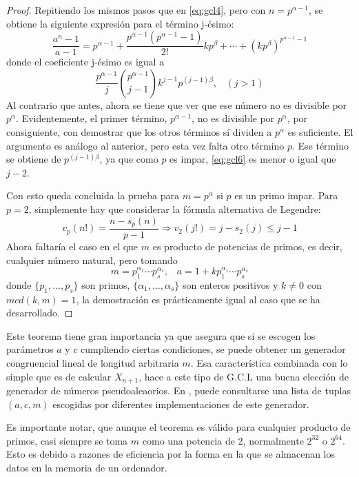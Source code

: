 \begin{proof}
Repitiendo los mismos pasos que en \eqref{eq:gcl4}, pero con $n=p^{\alpha-1}$, se obtiene la siguiente expresión para el término j-ésimo:
\begin{equation}\label{eq:gcl5}
\frac{a^n-1}{a-1}=p^{\alpha-1}+\frac{p^{\alpha-1}(p^{\alpha-1}-1)}{2!}kp^\beta+\cdots+(kp^\beta)^{p^{\alpha-1}-1}
\end{equation}
donde el coeficiente j-ésimo es igual a
\[
\frac{p^{\alpha-1}}{j} \binom{p^{\alpha-1}}{j-1} k^{j-1}p^{(j-1)\beta}, \;\;\; (j>1)
\]
Al contrario que antes, ahora se tiene que ver que ese número no es divisible por $p^\alpha$. Evidentemente, el primer término, $p^{\alpha-1}$, no es divisible por $p^\alpha$, por consiguiente, con demostrar que los otros términos sí dividen a $p^\alpha$ es suficiente. El argumento es análogo al anterior, pero esta vez falta otro término $p$. Ese término se obtiene de $p^{(j-1)\beta}$, ya que como $p$ es impar, \eqref{eq:gcl6} es menor o igual que $j-2$.

Con esto queda concluida la prueba para $m=p^\alpha$ si $p$ es un primo impar. Para $p=2$, simplemente hay que considerar la fórmula alternativa de Legendre:
\[
v_p(n!)=\frac{n-s_p(n)}{p-1} \Rightarrow v_2(j!)=j-s_2(j)\leq j-1
\]
Ahora faltaría el caso en el que $m$ es producto de potencias de primos, es decir, cualquier número natural, pero tomando 
\[
m=p_1^{\alpha_1}\cdots p_s^{\alpha_s}, \;\;\; a=1+kp_1^{\alpha_1}\cdots p_s^{\alpha_s}
\]
donde $\{p_1,\ldots, p_s\}$ son primos, $\{\alpha_1,\ldots,\alpha_s\}$ son enteros positivos y $k\neq 0$ con $mcd(k,m)=1$, la demostración es prácticamente igual al caso que se ha desarrollado.
\end{proof}

Este teorema tiene gran importancia ya que asegura que si se escogen los parámetros $a$ y $c$ cumpliendo ciertas condiciones, se puede obtener un generador congruencial lineal de longitud arbitraria $m$. Esa característica combinada con lo simple que es de calcular $X_{n+1}$, hace a este tipo de G.C.L una buena elección de generador de números pseudoaleaorios. En \cite{gentle2006random}, puede consultarse una lista de tuplas $(a,c,m)$ escogidas por diferentes implementaciones de este generador.

\begin{remark}
Es importante notar, que aunque el teorema es válido para cualquier producto de primos, casi siempre se toma $m$ como una potencia de 2, normalmente $2^{32}$ o $2^{64}$. Esto es debido a razones de eficiencia por la forma en la que se almacenan los datos en la memoria de un ordenador.
\end{remark}

